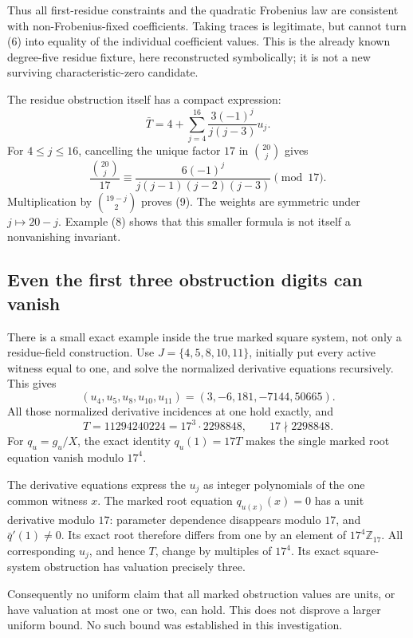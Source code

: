 \documentclass[
  british,
  10pt,
]{article}
\begin{document}
Thus all first-residue constraints and the quadratic Frobenius law are
consistent with non-Frobenius-fixed coefficients. Taking traces is
legitimate, but cannot turn (6) into equality of the individual
coefficient values. This is the already known degree-five residue
fixture, here reconstructed symbolically; it is not a new surviving
characteristic-zero candidate.

The residue obstruction itself has a compact expression: \[
\bar T=4+\sum_{j=4}^{16}
\frac{3(-1)^j}{j(j-3)}u_j.
\tag{9}
\] For \(4\leq j\leq16\), cancelling the unique factor \(17\) in
\(\binom{20}{j}\) gives \[
\frac{\binom{20}{j}}{17}
\equiv\frac{6(-1)^j}{j(j-1)(j-2)(j-3)}\pmod{17}.
\] Multiplication by \(\binom{19-j}{2}\) proves (9). The weights are
symmetric under \(j\mapsto20-j\). Example (8) shows that this smaller
formula is not itself a nonvanishing invariant.

\subsection{Even the first three obstruction digits can
vanish}\label{even-the-first-three-obstruction-digits-can-vanish}

There is a small exact example inside the true marked square system, not
only a residue-field construction. Use \(J=\{4,5,8,10,11\}\), initially
put every active witness equal to one, and solve the normalized
derivative equations recursively. This gives \[
(u_4,u_5,u_8,u_{10},u_{11})
=(3,-6,181,-7144,50665).
\] All those normalized derivative incidences at one hold exactly, and
\[
T=11294240224=17^3\cdot2298848,\qquad 17\nmid2298848.
\tag{10}
\] For \(q_u=g_u/X\), the exact identity \(q_u(1)=17T\) makes the single
marked root equation vanish modulo \(17^4\).

The derivative equations express the \(u_j\) as integer polynomials of
the one common witness \(x\). The marked root equation \(q_{u(x)}(x)=0\)
has a unit derivative modulo \(17\): parameter dependence disappears
modulo \(17\), and \(\bar q'(1)\ne0\). Its exact root therefore differs
from one by an element of \(17^4\mathbb Z_{17}\). All corresponding
\(u_j\), and hence \(T\), change by multiples of \(17^4\). Its exact
square-system obstruction has valuation precisely three.

Consequently no uniform claim that all marked obstruction values are
units, or have valuation at most one or two, can hold. This does not
disprove a larger uniform bound. No such bound was established in this
investigation.
\end{document}
